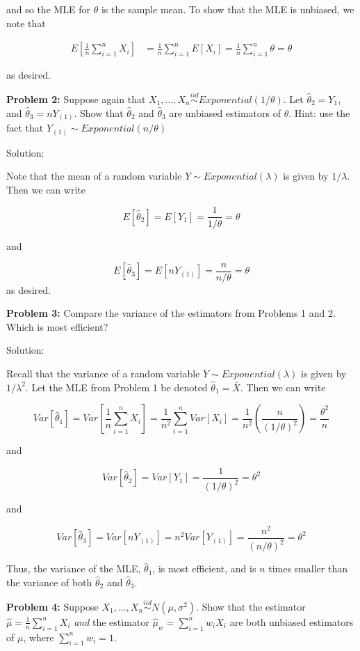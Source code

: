 \documentclass[
  letterpaper,
  DIV=11,
  numbers=noendperiod]{scrreprt}
\begin{document}
and so the MLE for \(\theta\) is the sample mean. To show that the MLE
is unbiased, we note that

\begin{align*}
    E \left[ \frac{1}{n} \sum_{i = 1}^n X_i \right] & = \frac{1}{n} \sum_{i = 1}^n E[X_i] = \frac{1}{n} \sum_{i = 1}^n \theta  = \theta
\end{align*}

as desired.

\textbf{Problem 2:} Suppose again that
\(X_1, \dots, X_n \overset{iid}{\sim} Exponential(1/\theta)\). Let
\(\hat{\theta}_2 = Y_1\), and \(\hat{\theta}_3 = nY_{(1)}\). Show that
\(\hat{\theta}_2\) and \(\hat{\theta}_3\) are unbiased estimators of
\(\theta\). Hint: use the fact that
\(Y_{(1)} \sim Exponential(n/\theta)\)

Solution:

Note that the mean of a random variable \(Y \sim Exponential(\lambda)\)
is given by \(1/\lambda\). Then we can write

\[
E[\hat{\theta}_2] = E[Y_1] = \frac{1}{1/\theta} = \theta
\]

and

\[
E[\hat{\theta}_3] = E[nY_{(1)}] = \frac{n}{n/\theta} = \theta
\] as desired.

\textbf{Problem 3:} Compare the variance of the estimators from Problems
1 and 2. Which is most efficient?

Solution:

Recall that the variance of a random variable
\(Y \sim Exponential(\lambda)\) is given by \(1/\lambda^2\). Let the MLE
from Problem 1 be denoted \(\hat{\theta}_1 = \bar{X}\). Then we can
write

\[
Var\left[\hat{\theta}_1\right] = Var\left[\frac{1}{n} \sum_{i = 1}^n X_i\right] = \frac{1}{n^2} \sum_{i = 1}^n Var[X_i] = \frac{1}{n^2} \left( \frac{n}{(1/\theta)^2} \right) = \frac{\theta^2}{n}
\]

and

\[
Var\left[\hat{\theta}_2\right] = Var[Y_1] = \frac{1}{(1/\theta)^2} = \theta^2
\]

and

\[
Var\left[\hat{\theta}_3\right] = Var[nY_{(1)}] = n^2 Var[Y_{(1)}] = \frac{n^2}{(n/\theta)^2} = \theta^2
\]

Thus, the variance of the MLE, \(\hat{\theta}_1\), is most efficient,
and is \(n\) times smaller than the variance of both \(\hat{\theta}_2\)
and \(\hat{\theta}_3\).

\textbf{Problem 4:} Suppose
\(X_1, \dots, X_n \overset{iid}{\sim} N(\mu, \sigma^2)\). Show that the
estimator \(\hat{\mu} = \frac{1}{n} \sum_{i = 1}^n X_i\) \emph{and} the
estimator \(\hat{\mu}_w = \sum_{i = 1}^n w_i X_i\) are both unbiased
estimators of \(\mu\), where \(\sum_{i = 1}^n w_i = 1\).
\end{document}
